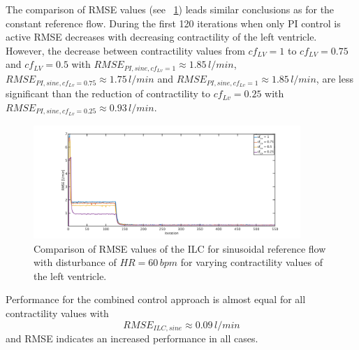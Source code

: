 The comparison of RMSE values (see \figurename~\ref{fig:RMSE_dist_sine_var_cf}) leads similar conclusions as for the constant reference flow. During the first 120 iterations when only PI control is active RMSE decreases with decreasing contractility of the left ventricle. However, the decrease between contractility values from $cf_{LV}=1$ to $cf_{LV}=0.75$ and $cf_{LV}=0.5$ with $RMSE_{PI,sine,cf_{Lv}=1}\approx 1.85\, l/min$, $RMSE_{PI,sine,cf_{Lv}=0.75}\approx 1.75\, l/min$ and $RMSE_{PI,sine,cf_{Lv}=1}\approx 1.85\, l/min$, are less significant than the reduction of contractility to $cf_{Lv}=0.25$ with $RMSE_{PI,sine,cf_{Lv}=0.25}\approx 0.93\, l/min$.
\begin{figure}[ht!]
  \centering
  \includegraphics[width=0.9\textwidth]{images/chapt_5/ILC/RMSE_dist_sine_var_cf.pdf}
  \caption[RMSE Comparison of ILC at sinusoidal reference flow for varying left ventricular contractilities]{Comparison of RMSE values of the ILC for sinusoidal reference flow with disturbance of $HR=60\,bpm$ for varying contractility values of the left ventricle.}
  \label{fig:RMSE_dist_sine_var_cf}
\end{figure}
Performance for the combined control approach is almost equal for all contractility values with
\begin{equation}
  RMSE_{ILC,sine}\approx 0.09\, l/min
\end{equation}
and RMSE indicates an increased performance in all cases.

